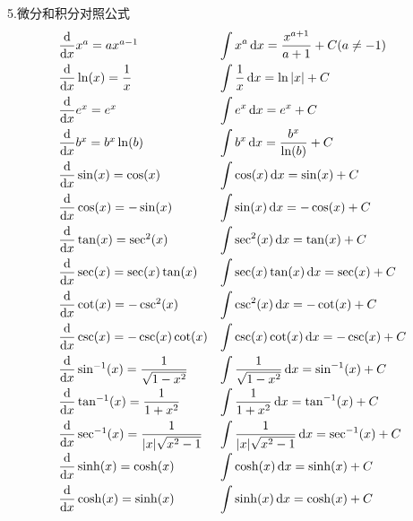5.微分和积分对照公式\\
\begin{displaymath}
\begin{array}{l l}
\dfrac{\dif}{\dif x}x^a=ax^{a-1} & \displaystyle\int x^a\dif x=\dfrac{x^{a+1}}{a+1}+C(a\neq -1)\\[2ex]
\dfrac{\dif}{\dif x}\ln(x)=\dfrac{1}{x} & \displaystyle\int\dfrac{1}{x}\dif x=\ln|x|+C\\[2ex]
\dfrac{\dif}{\dif x}e^x=e^x & \displaystyle\int e^x\dif x=e^x+C\\[2ex]
\dfrac{\dif}{\dif x}b^x=b^x\ln(b) & \displaystyle\int b^x\dif x=\dfrac{b^x}{\ln(b)}+C\\[2ex]
\dfrac{\dif}{\dif x}\sin(x)=\cos(x) & \displaystyle\int \cos(x)\dif x=\sin(x)+C\\[2ex]
\dfrac{\dif}{\dif x}\cos(x)=-\sin(x) & \displaystyle\int \sin(x)\dif x=-\cos(x)+C\\[2ex]
\dfrac{\dif}{\dif x}\tan(x)=\sec^2(x) & \displaystyle\int \sec^2(x)\dif x=\tan(x)+C\\[2ex]
\dfrac{\dif}{\dif x}\sec(x)=\sec(x)\tan(x) & \displaystyle\int \sec(x)\tan(x)\dif x=\sec(x)+C\\[2ex]
\dfrac{\dif}{\dif x}\cot(x)=-\csc^2(x) & \displaystyle\int \csc^2(x)\dif x=-\cot(x)+C\\[2ex]
\dfrac{\dif}{\dif x}\csc(x)=-\csc(x)\cot(x) & \displaystyle\int \csc(x)\cot(x)\dif x=-\csc(x)+C\\[2ex]
\dfrac{\dif}{\dif x}\sin^{-1}(x)=\dfrac{1}{\sqrt{1-x^2}} & \displaystyle\int \dfrac{1}{\sqrt{1-x^2}}\dif x=\sin^{-1}(x)+C\\[2ex]
\dfrac{\dif}{\dif x}\tan^{-1}(x)=\dfrac{1}{1+x^2} & \displaystyle\int \dfrac{1}{1+x^2}\dif x=\tan^{-1}(x)+C\\[2ex]
\dfrac{\dif}{\dif x}\sec^{-1}(x)=\dfrac{1}{|x|\sqrt{x^2-1}} & \displaystyle\int \dfrac{1}{|x|\sqrt{x^2-1}}\dif x=\sec^{-1}(x)+C\\[2ex]
\dfrac{\dif}{\dif x}\sinh(x)=\cosh(x) & \displaystyle\int \cosh(x)\dif x=\sinh(x)+C\\[2ex]
\dfrac{\dif}{\dif x}\cosh(x)=\sinh(x) & \displaystyle\int \sinh(x)\dif x=\cosh(x)+C
\end{array}
\end{displaymath}
